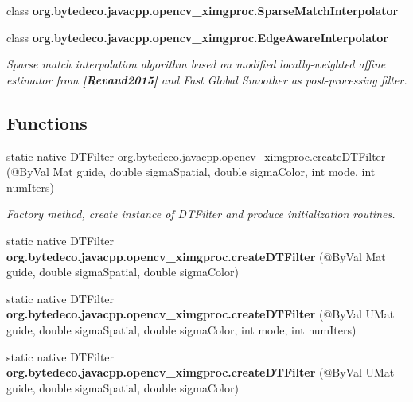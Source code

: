 \begin{DoxyCompactItemize}
class {\bfseries org.\+bytedeco.\+javacpp.\+opencv\+\_\+ximgproc.\+Sparse\+Match\+Interpolator}
\item 
class {\bfseries org.\+bytedeco.\+javacpp.\+opencv\+\_\+ximgproc.\+Edge\+Aware\+Interpolator}
\begin{DoxyCompactList}\small\item\em Sparse match interpolation algorithm based on modified locally-\/weighted affine estimator from {\bfseries [Revaud2015]} and Fast Global Smoother as post-\/processing filter. \end{DoxyCompactList}\end{DoxyCompactItemize}
\subsection*{Functions}
\begin{DoxyCompactItemize}
\item 
static native D\+T\+Filter \hyperlink{group__ximgproc__filters_ga813031e38babc7f53070fcf67dbfea40}{org.\+bytedeco.\+javacpp.\+opencv\+\_\+ximgproc.\+create\+D\+T\+Filter} (@By\+Val Mat guide, double sigma\+Spatial, double sigma\+Color, int mode, int num\+Iters)
\begin{DoxyCompactList}\small\item\em Factory method, create instance of D\+T\+Filter and produce initialization routines. \end{DoxyCompactList}\item 
\mbox{\label{group__ximgproc__filters_gad54f3efa139d2446cf7e5e6b1d0468ce}} 
static native D\+T\+Filter {\bfseries org.\+bytedeco.\+javacpp.\+opencv\+\_\+ximgproc.\+create\+D\+T\+Filter} (@By\+Val Mat guide, double sigma\+Spatial, double sigma\+Color)
\item 
\mbox{\label{group__ximgproc__filters_ga1a4ca774b8f9d2dd29f78e88d4f14dc5}} 
static native D\+T\+Filter {\bfseries org.\+bytedeco.\+javacpp.\+opencv\+\_\+ximgproc.\+create\+D\+T\+Filter} (@By\+Val U\+Mat guide, double sigma\+Spatial, double sigma\+Color, int mode, int num\+Iters)
\item 
\mbox{\label{group__ximgproc__filters_gabba4f51a01b4eafa461df64e50b153a1}} 
static native D\+T\+Filter {\bfseries org.\+bytedeco.\+javacpp.\+opencv\+\_\+ximgproc.\+create\+D\+T\+Filter} (@By\+Val U\+Mat guide, double sigma\+Spatial, double sigma\+Color)

\end{DoxyCompactItemize}
